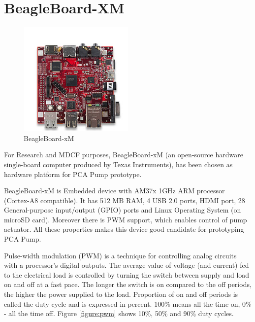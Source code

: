 \section{BeagleBoard-XM}
\label{pcapump:beagleboard}

\begin{figure}
  \begin{center}
    \includegraphics[width=0.5\textwidth]{figures/beagleboard_xm.png}
  \end{center}
  \caption{BeagleBoard-xM}
  \label{figure:beagleboard_xm}
\end{figure}

For Research and MDCF purposes, BeagleBoard-xM (an open-source hardware single-board computer produced by Texas Instruments), has been chosen as hardware platform for PCA Pump prototype.

BeagleBoard-xM is Embedded device with AM37x 1GHz ARM processor (Cortex-A8 compatible). It has 512 MB RAM, 4 USB 2.0 ports, HDMI port, 28 General-purpose input/output (GPIO) ports and Linux Operating System (on microSD card). Moreover there is PWM support, which enables control of pump actuator. All these properties makes this device good candidate for prototyping PCA Pump.

Pulse-width modulation (PWM) is a technique for controlling analog circuits with a processor's digital outputs. The average value of voltage (and current) fed to the electrical load is controlled by turning the switch between supply and load on and off at a fast pace. The longer the switch is on compared to the off periods, the higher the power supplied to the load. Proportion of on and off periods is called the duty cycle and is expressed in percent. 100\% means all the time on, 0\% - all the time off. Figure \ref{figure:pwm} shows 10\%, 50\% and 90\% duty cycles.


